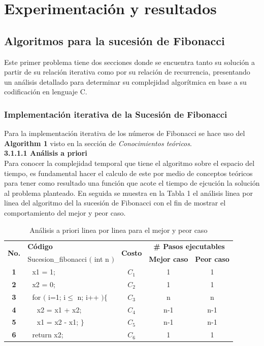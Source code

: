 \documentclass[12pt,twoside]{article}
\begin{document}
\section{Experimentaci\'on y resultados}
\subsection{Algoritmos para la sucesi\'on de Fibonacci}
Este primer problema tiene dos secciones donde se encuentra tanto su soluci\'on a partir de su relaci\'on iterativa como por su relaci\'on de recurrencia, presentando un an\'alisis detallado para determinar su complejidad algor\'itmica en base a su codificaci\'on en lenguaje C.
\subsubsection{Implementaci\'on iterativa de la Sucesión de Fibonacci}
Para la implementaci\'on iterativa de los n\'umeros de Fibonacci se hace uso del \textbf{Algorithm 1} visto en la sección de \textit{Conocimientos te\'oricos}.\\[0.6cm]
\textbf{3.1.1.1 An\'alisis a priori}\\[0.4cm]
Para conocer la complejidad temporal que tiene el algoritmo sobre el espacio del tiempo, es fundamental hacer el calculo de este por medio de conceptos te\'oricos para tener como resultado una funci\'on que acote el tiempo de ejcuci\'on la soluci\'on al problema planteado. En seguida se muestra en la Tabla 1 el an\'alisis linea por linea del algoritmo del la sucesi\'on de Fibonacci con el fin de mostrar el comportamiento del mejor y peor caso.
\newline
\begin{longtable}{||c|l|c|c|c||}
    \caption{An\'alisis a priori linea por linea para el mejor y peor caso}\\
    \hline
        \multirow{2}{*}{\textbf{No.}} & \textbf{C\'odigo} & \multirow{2}{*}{\textbf{Costo}} & \multicolumn{2}{|c||}{\textbf{\# Pasos ejecutables}}\\
    \cline{2-2}\cline{4-5}
         & {Sucesion\_fibonacci $($ int n $)$} & & \textbf{Mejor caso} & \textbf{Peor caso}\\
    \hline
    \textbf{1}&{\,\,\,\,x1 = 1;}&{$C_{1}$}&{1}&{1}\\
    \hline
    \textbf{2}&{\,\,\,\,x2 = 0;}&{$C_{2}$}&{1}&{1}\\
    \hline
    \textbf{3}&{\,\,\,\,for $($ i=1; i$\leq$ n; i++ $)\{$}&{$C_{3}$}&{n}&{n}\\
    \hline
    \textbf{4}&{\,\,\,\,\,\,\,\,x2 = x1 + x2;}&{$C_{4}$}&{n-1}&{n-1}\\
    \hline
    \textbf{5}&{\,\,\,\,\,\,\,\,x1 = x2 - x1; $\}$}&{$C_{5}$}&{n-1}&{n-1}\\
    \hline
    \textbf{6}&{\,\,\,\,return x2;}&{$C_{6}$}&{1}&{1}\\
    \hline
\end{longtable}
\end{document}
